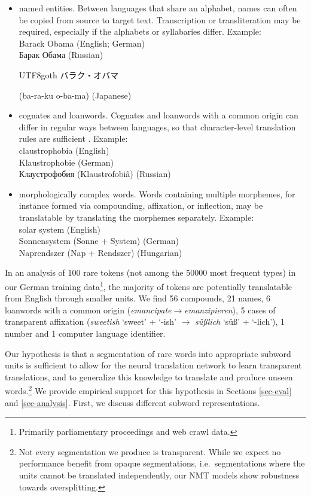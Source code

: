 \begin{itemize}

\item named entities. Between languages that share an alphabet, names can often be copied from source to target text. Transcription or transliteration may be required, especially if the alphabets or syllabaries differ. Example:\\
Barack Obama (English; German)\\
\foreignlanguage{russian}{Барак Обама} (Russian)\\
\begin{CJK*}{UTF8}{goth}
\small \CJKnospace \ignorespaces
バラク・オバマ
\end{CJK*}
(ba-ra-ku o-ba-ma) (Japanese) \item cognates and loanwords. Cognates and loanwords with a common origin can differ in regular ways between languages, so that character-level translation rules are sufficient \cite{tiedemann:2012:EACL2012}. Example:\\
claustrophobia (English)\\ Klaustrophobie (German)\\
\foreignlanguage{russian}{Клаустрофобия} (Klaustrofobiâ) (Russian) \item morphologically complex words. Words containing multiple morphemes, for instance formed via compounding, affixation, or inflection, may be translatable by translating the morphemes separately. Example:\\
solar system (English)\\ Sonnensystem (Sonne + System) (German)\\ Naprendszer (Nap + Rendszer) (Hungarian)
\end{itemize}

In an analysis of 100 rare tokens (not among the \num{50000} most frequent types) in our German training data\footnote{Primarily parliamentary proceedings and web crawl data.}, the majority of tokens are potentially translatable from English through smaller units. We find 56 compounds, 21 names, 6 loanwords with a common origin (\emph{emancipate}$\to$\emph{emanzipieren}),
5 cases of transparent affixation (\emph{sweetish} `sweet' + `-ish' $\to$ \emph{süßlich} `süß' + `-lich'), 1 number and 1 computer language identifier.

Our hypothesis is that a segmentation of rare words into appropriate subword units is sufficient to allow for the neural translation network to learn transparent translations, and to generalize this knowledge to translate and produce unseen words.\footnote{Not every segmentation we produce is transparent. While we expect no performance benefit from opaque segmentations, i.e.\ segmentations where the units cannot be translated independently, our NMT models show robustness towards oversplitting.} We provide empirical support for this hypothesis in Sections \ref{sec-eval} and \ref{sec-analysis}.
First, we discuss different subword representations.

